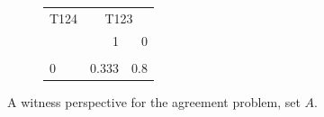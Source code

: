 \documentclass[
  10pt,
]{scrartcl}
\begin{document}
\begin{figure}[H]
{\begin{subfigure}[!ht]{0.3\textwidth}
\end{subfigure} }\hfill
\begin{subfigure}[!ht]{0.6\textwidth}
\centering\begingroup\fontsize{9}{11}\selectfont
\begin{tabular}{lrr}
\toprule
\multicolumn{1}{c}{T124} & \multicolumn{2}{c}{T123} \\
  & 1 & 0\\
\midrule
\cellcolor{gray!6}{1} & \cellcolor{gray!6}{0.667} & \cellcolor{gray!6}{0.2}\\
0 & 0.333 & 0.8\\
\bottomrule
\end{tabular}
\endgroup{}
\end{subfigure}
\caption{A witness perspective for the \textsf{agreement} problem, set $A$.}
\end{figure}
\end{document}
